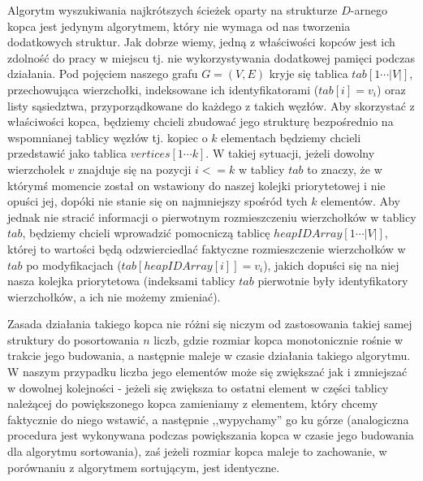Algorytm wyszukiwania najkrótszych ścieżek oparty na strukturze $D$-arnego kopca jest jedynym algorytmem, który nie wymaga od nas tworzenia dodatkowych struktur. Jak dobrze wiemy, jedną z właściwości kopców jest ich zdolność do pracy w miejscu tj. nie wykorzystywania dodatkowej pamięci podczas działania. Pod pojęciem naszego grafu $G = \left( V, E \right)$ kryje się tablica $tab \left[ 1 \cdots \left| V\right| \right]$, przechowująca wierzchołki, indeksowane ich identyfikatorami ($tab[i]=v_{i}$) oraz listy sąsiedztwa, przyporządkowane do każdego z takich węzłów. Aby skorzystać z właściwości kopca, będziemy chcieli zbudować jego strukturę bezpośrednio na wspomnianej tablicy węzłów tj. kopiec o $k$ elementach będziemy chcieli przedstawić jako tablica $vertices \left[ 1 \cdots k \right]$. W takiej sytuacji, jeżeli dowolny wierzchołek $v$ znajduje się na pozycji $i <= k $ w tablicy $tab$ to znaczy, że w którymś momencie został on wstawiony do naszej kolejki priorytetowej i nie opuści jej, dopóki nie stanie się on najmniejszy spośród tych $k$ elementów. Aby jednak nie stracić informacji o pierwotnym rozmieszczeniu wierzchołków w tablicy $tab$, będziemy chcieli wprowadzić pomocniczą tablicę $heapIDArray \left[ 1 \cdots \left| V\right| \right]$, której to wartości będą odzwierciedlać faktyczne rozmieszczenie wierzchołków w $tab$ po modyfikacjach ($tab \left[ heapIDArray \left[ i \right] \right] = v_{i}$), jakich dopuści się na niej nasza kolejka priorytetowa (indeksami tablicy $tab$ pierwotnie były identyfikatory wierzchołków, a ich nie możemy zmieniać).

Zasada działania takiego kopca nie różni się niczym od zastosowania takiej samej struktury do posortowania $n$ liczb, gdzie rozmiar kopca monotonicznie rośnie w trakcie jego budowania, a następnie maleje w czasie działania takiego algorytmu. W naszym przypadku liczba jego elementów może się zwiększać jak i zmniejszać w dowolnej kolejności - jeżeli się zwiększa to ostatni element w części tablicy należącej do powiększonego kopca zamieniamy z elementem, który chcemy faktycznie do niego wstawić, a następnie ,,wypychamy'' go ku górze (analogiczna procedura jest wykonywana podczas powiększania kopca w czasie jego budowania dla algorytmu sortowania), zaś jeżeli rozmiar kopca maleje to zachowanie, w porównaniu z algorytmem sortującym, jest identyczne.

